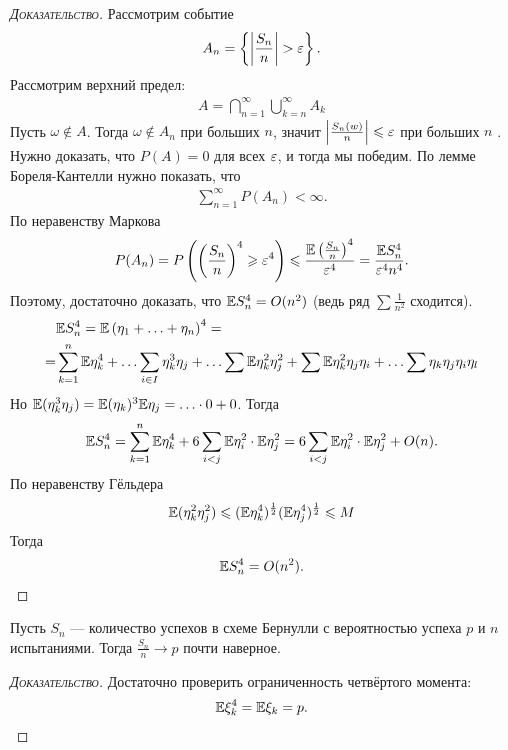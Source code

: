 \documentclass[../main.tex]{subfiles}
\begin{document}
\begin{proof}[\normalfont\textsc{Доказательство}]
 Рассмотрим событие
 \begin{align*}
  A_n = \left\{ \left| \frac{S_n}{n} \right| > \varepsilon \right\}.
 \end{align*} Рассмотрим верхний предел:
 \begin{align*}
  A = \bigcap_{n=1}^{\infty} \bigcup_{k=n}^{\infty} A_k
 \end{align*} Пусть $ \omega \notin A $. Тогда $ \omega \notin A_n $ при больших $ n $, значит $ \left| \frac{S_n(w)}{n} \right| \leqslant \varepsilon $  при больших $ n $ . Нужно доказать, что $ P(A) = 0 $ для всех  $ \varepsilon $, и тогда мы победим. По лемме Бореля-Кантелли нужно показать, что
 \begin{align*}
  \sum_{n=1}^{\infty} P(A_n) < \infty.
 \end{align*} По неравенству Маркова
 \begin{align*}
  P(A_n) = P \left( \left( \frac{S_n}{n} \right)^{4} \geqslant \varepsilon^{4} \right) \leqslant \frac{\mathbb E \left( \frac{S_n}{n} \right)^{4}}{\varepsilon^{4}} = \frac{\mathbb E S_n^{4}}{\varepsilon^{4} n^{4}}.
 \end{align*} Поэтому, достаточно доказать, что $ \mathbb E S_n^{4} = O(n^{2}) $ (ведь ряд $ \sum \frac{1}{n^{2}} $ сходится).
 \begin{align*}
  &\mathbb E S_n^{4} = \mathbb E \left( \eta_1 + \ldots + \eta_n \right)^{4} = \\
  = &\sum_{k=1}^{n}\mathbb E\eta_k^{4} + \ldots \sum_{i \in I} \eta_k^{3} \eta_j + \ldots \sum \mathbb E \eta_k^{2} \eta_j^{2} + \sum \mathbb E \eta^{2}_k \eta_j \eta_i + \ldots \sum \eta_k \eta_j \eta_i \eta_l
 \end{align*} Но $ \mathbb E(\eta_k^{3} \eta_j) = \mathbb E(\eta_k)^{3} \mathbb E \eta_j = \ldots \cdot 0 + 0 $. Тогда
 \begin{align*}
  \mathbb E S_n^{4} = \sum_{k=1}^{n}\mathbb E \eta_k^{4} + 6 \sum_{i < j} \mathbb E \eta_i^{2} \cdot \mathbb E \eta_j^{2} = 6 \sum_{i < j} \mathbb E \eta_i^{2} \cdot \mathbb E \eta_j^{2} + O(n).
 \end{align*}
 По неравенству Гёльдера
 \begin{align*}
  \mathbb E(\eta_k^{2} \eta_j^{2}) \leqslant (\mathbb E \eta_k^{4})^{\frac{1}{2}}(\mathbb E \eta_j^{4})^{\frac{1}{2}} \leqslant M
 \end{align*} Тогда
 \begin{align*}
  \mathbb E S_n^{4} = O(n^{2}).
 \end{align*}
\end{proof}

\begin{crly}
 Пусть $ S_n $ --- количество успехов в схеме Бернулли с вероятностью успеха  $ p $ и  $ n $ испытаниями. Тогда $ \frac{S_n}{n} \to p $  почти наверное.
\end{crly}
\begin{proof}[\normalfont\textsc{Доказательство}]
 Достаточно проверить ограниченность четвёртого момента:
 \begin{align*}
  \mathbb E \xi_k^{4} = \mathbb E \xi_k = p.
 \end{align*}
\end{proof}
\end{document}
